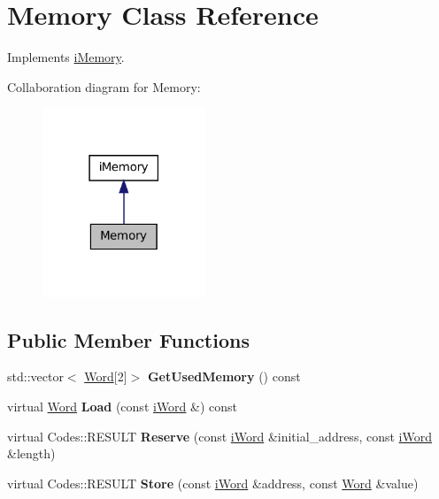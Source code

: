 \hypertarget{classMemory}{
\section{Memory Class Reference}
\label{classMemory}
}


Implements \hyperlink{classiMemory}{iMemory}.  




Collaboration diagram for Memory:\nopagebreak
\begin{figure}[H]
\begin{center}
\leavevmode
\includegraphics[width=138pt]{classMemory__coll__graph}
\end{center}
\end{figure}
\subsection*{Public Member Functions}
\begin{DoxyCompactItemize}
\item 
\hypertarget{classMemory_a8a06a6f30a19b58795ab40f9f48dca4f}{
std::vector$<$ \hyperlink{classWord}{Word}\mbox{[}2\mbox{]}$>$ {\bfseries GetUsedMemory} () const }
\label{classMemory_a8a06a6f30a19b58795ab40f9f48dca4f}

\item 
\hypertarget{classMemory_aca021609915080b38ca1b00d9b416e80}{
virtual \hyperlink{classWord}{Word} {\bfseries Load} (const \hyperlink{classiWord}{iWord} \&) const }
\label{classMemory_aca021609915080b38ca1b00d9b416e80}

\item 
\hypertarget{classMemory_a80cd994d4833dde66b8005184e510dda}{
virtual Codes::RESULT {\bfseries Reserve} (const \hyperlink{classiWord}{iWord} \&initial\_\-address, const \hyperlink{classiWord}{iWord} \&length)}
\label{classMemory_a80cd994d4833dde66b8005184e510dda}

\item 
\hypertarget{classMemory_a23703464fb24710d09be1b2010e79edc}{
virtual Codes::RESULT {\bfseries Store} (const \hyperlink{classiWord}{iWord} \&address, const \hyperlink{classWord}{Word} \&value)}
\label{classMemory_a23703464fb24710d09be1b2010e79edc}

\end{DoxyCompactItemize}
